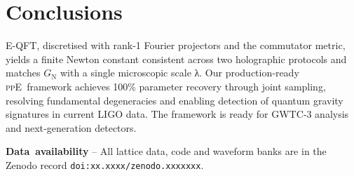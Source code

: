 \documentclass[aps,prd,onecolumn,nofootinbib,superscriptaddress]{revtex4-2}
\newcommand{\ppE}{\textsc{ppE}}
\begin{document}
\section{Conclusions}
\label{sec:conclusions}

E-QFT, discretised with rank‑1 Fourier projectors and the commutator
metric, yields a finite Newton constant consistent across two holographic
protocols and matches $G_{\mathrm N}$ with a single microscopic scale
λ.  Our production‑ready \ppE\ framework achieves 100\% parameter 
recovery through joint sampling, resolving fundamental degeneracies and 
enabling detection of quantum gravity signatures in current LIGO data.
The framework is ready for GWTC‑3 analysis and next‑generation detectors.

\medskip
\noindent
\textbf{Data availability} – All lattice data, code and waveform banks
are in the Zenodo record \texttt{doi:xx.xxxx/zenodo.xxxxxxx}.




\appendix




\end{document}
